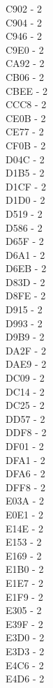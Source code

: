 \documentclass[10pt,letterpaper]{article}
\begin{document}
\begin{multicols}{5}
C902 -  2\\
C904 -  2\\
C946 -  2\\
C9E0 -  2\\
CA92 -  2\\
CB06 -  2\\
CBEE -  2\\
CCC8 -  2\\
CE0B -  2\\
CE77 -  2\\
CF0B -  2\\
D04C -  2\\
D1B5 -  2\\
D1CF -  2\\
D1D0 -  2\\
D519 -  2\\
D586 -  2\\
D65F -  2\\
D6A1 -  2\\
D6EB -  2\\
D83D -  2\\
D8FE -  2\\
D915 -  2\\
D993 -  2\\
D9B9 -  2\\
DA2F -  2\\
DAE9 -  2\\
DC09 -  2\\
DC14 -  2\\
DC25 -  2\\
DD57 -  2\\
DDF8 -  2\\
DF01 -  2\\
DFA1 -  2\\
DFA6 -  2\\
DFF8 -  2\\
E03A -  2\\
E0E1 -  2\\
E14E -  2\\
E153 -  2\\
E169 -  2\\
E1B0 -  2\\
E1E7 -  2\\
E1F9 -  2\\
E305 -  2\\
E39F -  2\\
E3D0 -  2\\
E3D3 -  2\\
E4C6 -  2\\
E4D6 -  2\\

\end{multicols}
\end{document}
